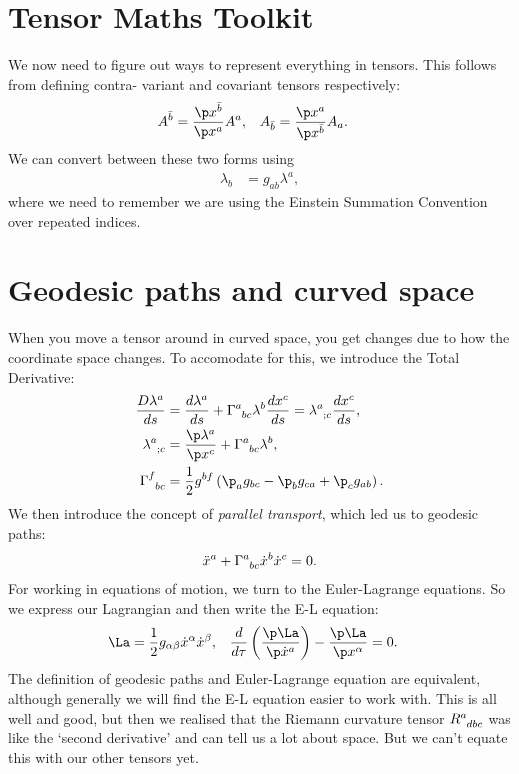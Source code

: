 \documentclass[a4paper, 11pt, normalem]{report}
\begin{document}
\section{Tensor Maths Toolkit}
We now need to figure out ways to represent everything in tensors.
This follows from defining contra- variant and covariant tensors respectively:
\begin{align}
    A^{\bar{b}} &= \frac{\p x^{\bar{b}}}{\p x^a}A^a, & A_{\bar{b}} &= \frac{\p x^a}{\p x^{\bar{b}}}A_a.
\end{align}
We can convert between these two forms using 
\begin{align}
    \lambda_b &= g_{ab}\lambda^a,
\end{align}
where we need to remember we are using the Einstein Summation Convention over repeated indices.

\section{Geodesic paths and curved space}
When you move a tensor around in curved space, you get changes due to how the coordinate space changes. 
To accomodate for this, we introduce the Total Derivative:
\begin{align}
    \frac{D\lambda^a}{ds} &= \frac{d\lambda^a}{ds} + \tensor{\Gamma}{^a_{bc}}\lambda^b\frac{dx^c}{ds} = \tensor{\lambda}{^a_{;c}}\frac{dx^c}{ds}, \\
    \tensor{\lambda}{^a_{;c}} &= \frac{\p\lambda^a}{\p x^c} + \tensor{\Gamma}{^a_{bc}}\lambda^b, \\
    \tensor{\Gamma}{^f_{bc}} &= \frac12 g^{bf}\left(\p_a g_{bc} - \p_b g_{ca} + \p_c g_{ab}\right).
\end{align}
We then introduce the concept of \emph{parallel transport}, which led us to geodesic paths:
\begin{align}
    \ddot{x}^a + \tensor{\Gamma}{^a_{bc}}\dot{x}^b\dot{x}^c = 0.
\end{align}
For working in equations of motion, we turn to the Euler-Lagrange equations. 
So we express our Lagrangian and then write the E-L equation:
\begin{align}
    \La &= \frac12 g_{\alpha\beta}\dot{x}^\alpha\dot{x}^\beta, & \frac{d}{d\tau}\left(\frac{\p\La}{\p\dot{x}^a}\right) - \frac{\p\La}{\p x^\alpha} &= 0.
\end{align}
The definition of geodesic paths and Euler-Lagrange equation are equivalent, although generally we will find the E-L equation easier to work with. 
This is all well and good, but then we realised that the Riemann curvature tensor $\tensor{R}{^a_{dbc}}$ was like the `second derivative' and can tell us a lot about space.
But we can't equate this with our other tensors yet. 
\end{document}
